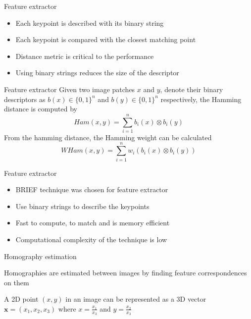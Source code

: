 \documentclass{beamer}
\begin{document}
\begin{frame}{Feature extractor}
  \begin{itemize}
    \item Each keypoint is described with its binary string
    \item Each keypoint is compared with the closest matching point
    \item Distance metric is critical to the performance
    \item Using binary strings reduces the size of the descriptor
  \end{itemize}
\end{frame}
\begin{frame}{Feature extractor}
  Given two image patches $x$ and $y$, denote their binary descriptors as $b(x) \in \{0,1\}^n$ and $b(y) \in \{0,1\}^n$ respectively, the Hamming distance is computed by
  $$Ham(x, y)=\sum_{i=1}^{n}b_i(x)\otimes b_i(y)$$
  From the hamming distance, the Hamming weight can be calculated
  $$WHam(x, y)=\sum_{i=1}^{n}w_i(b_i(x)\otimes b_i(y))$$
\end{frame}
\begin{frame}{Feature extractor}
  \begin{itemize}
    \item BRIEF technique was chosen for feature extractor
    \item Use binary strings to describe the keypoints
    \item Fast to compute, to match and is memory efficient
    \item Computational complexity of the technique is low
  \end{itemize}
\end{frame}
\begin{frame}{Homography estimation}
  \begin{block}{}
      Homographies are estimated between images by finding feature correspondences on them
  \end{block}
  \begin{block}{}
      A 2D point $(x,y)$ in an image can be represented as a 3D vector $\textbf{x} = (x_1, x_2, x_3)$ where $x = \frac{x_1}{x_3}$ and $y = \frac{x_2}{x_3}$
  \end{block}
\end{frame}
\end{document}
